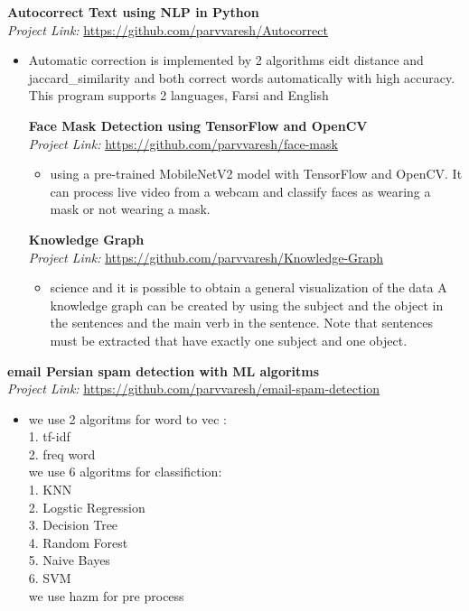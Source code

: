 \documentclass[a4paper,9pt]{extarticle}
\begin{document}
\noindent
\textbf{Autocorrect Text using NLP in Python} \hfill \\ %
\textit{Project Link:} \url{https://github.com/parvvaresh/Autocorrect} \hfill 
\begin{itemize}
    \item Automatic correction is implemented by 2 algorithms eidt distance and jaccard_similarity and both correct words automatically with high accuracy.
This program supports 2 languages, Farsi and English %

\noindent
\textbf{Face Mask Detection using TensorFlow and OpenCV} \hfill \\ %
\textit{Project Link:} \url{https://github.com/parvvaresh/face-mask} \hfill 
\begin{itemize}
    \item using a pre-trained MobileNetV2 model with TensorFlow and OpenCV. It can process live video from a webcam and classify faces as wearing a mask or not wearing a mask. %
\end{itemize}

\noindent
\textbf{Knowledge Graph} \hfill \\ %
\textit{Project Link:} \url{https://github.com/parvvaresh/Knowledge-Graph} \hfill 
\begin{itemize}
    \item science and it is possible to obtain a general visualization of the data A knowledge graph can be created by using the subject and the object in the sentences and the main verb in the sentence. Note that sentences must be extracted that have exactly one subject and one object. %
\end{itemize}



\end{itemize}
\textbf{email Persian spam detection with ML algoritms} \hfill \\ %
\textit{Project Link:} \url{https://github.com/parvvaresh/email-spam-detection} \hfill 
\begin{itemize}
    \item we use 2 algoritms for word to vec :\\

            1.  tf-idf\\
            2.  freq word\\
            we use 6 algoritms for classifiction:\\
            
            1.  KNN\\
            2.  Logstic Regression\\
            3.  Decision Tree\\
            4.  Random Forest\\
            5.  Naive Bayes\\
            6.  SVM\\
            we use hazm for pre process
\end{itemize}
\end{document}
